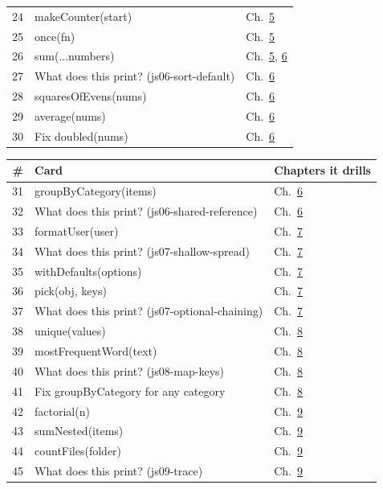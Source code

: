 \documentclass[10pt]{article}
\newcommand{\code}[1]{{\ttfamily\small #1}}
\begin{document}
{\begin{tabularx}{\linewidth}{@{}rXl@{}}
24 & \code{makeCounter(start)} & Ch.~\hyperref[ch:c05]{5}\\
25 & \code{once(fn)} & Ch.~\hyperref[ch:c05]{5}\\
26 & \code{sum(...numbers)} & Ch.~\hyperref[ch:c05]{5}, \hyperref[ch:c06]{6}\\
27 & What does this print? (js06-sort-default) & Ch.~\hyperref[ch:c06]{6}\\
28 & \code{squaresOfEvens(nums)} & Ch.~\hyperref[ch:c06]{6}\\
29 & \code{average(nums)} & Ch.~\hyperref[ch:c06]{6}\\
30 & \code{Fix doubled(nums)} & Ch.~\hyperref[ch:c06]{6}\\
\bottomrule\end{tabularx}}\par
{\footnotesize\begin{tabularx}{\linewidth}{@{}rXl@{}}\toprule
\textbf{\#} & \textbf{Card} & \textbf{Chapters it drills}\\\midrule
31 & \code{groupByCategory(items)} & Ch.~\hyperref[ch:c06]{6}\\
32 & What does this print? (js06-shared-reference) & Ch.~\hyperref[ch:c06]{6}\\
33 & \code{formatUser(user)} & Ch.~\hyperref[ch:c07]{7}\\
34 & What does this print? (js07-shallow-spread) & Ch.~\hyperref[ch:c07]{7}\\
35 & \code{withDefaults(options)} & Ch.~\hyperref[ch:c07]{7}\\
36 & \code{pick(obj, keys)} & Ch.~\hyperref[ch:c07]{7}\\
37 & What does this print? (js07-optional-chaining) & Ch.~\hyperref[ch:c07]{7}\\
38 & \code{unique(values)} & Ch.~\hyperref[ch:c08]{8}\\
39 & \code{mostFrequentWord(text)} & Ch.~\hyperref[ch:c08]{8}\\
40 & What does this print? (js08-map-keys) & Ch.~\hyperref[ch:c08]{8}\\
41 & \code{Fix groupByCategory for any category} & Ch.~\hyperref[ch:c08]{8}\\
42 & \code{factorial(n)} & Ch.~\hyperref[ch:c09]{9}\\
43 & \code{sumNested(items)} & Ch.~\hyperref[ch:c09]{9}\\
44 & \code{countFiles(folder)} & Ch.~\hyperref[ch:c09]{9}\\
45 & What does this print? (js09-trace) & Ch.~\hyperref[ch:c09]{9}\\

\end{tabularx}}
\end{document}

